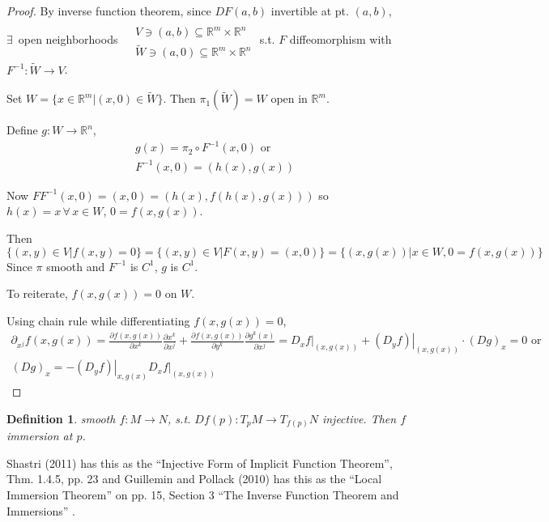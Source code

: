 \documentclass[10pt]{amsart}
\newtheorem{definition}{Definition}
\begin{document}
\begin{multicols*}{2}
\begin{proof}
By inverse function theorem, since $DF(a,b)$ invertible at pt. $(a,b)$, \\
$\exists \, $ open neighborhoods $\begin{aligned} & \quad \\
  & V \ni (a,b) \subseteq \mathbb{R}^m \times \mathbb{R}^n \\
  & \widetilde{W} \ni (a,0) \subseteq \mathbb{R}^m \times \mathbb{R}^n \end{aligned}$ s.t. $F$ diffeomorphism with $F^{-1}: \widetilde{W} \to V$. 

Set $W = \lbrace x \in \mathbb{R}^m | (x,0) \in \widetilde{W}\rbrace$.  Then $\pi_1(\widetilde{W}) =W$ open in $\mathbb{R}^m$.  

Define $g:W\to \mathbb{R}^n$, 
\[
\begin{aligned}
  & g(x) = \pi_2 \circ F^{-1}(x,0) \text{ or } \\ 
  & F^{-1}(x,0) = (h(x),g(x))
\end{aligned}
\]

Now $FF^{-1}(x,0) = (x,0) = (h(x), f(h(x),g(x)) )$ so $h(x)=x \, \forall \, x \in W$, $0 = f(x,g(x))$.  

Then
\[
\lbrace (x,y) \in V | f(x,y) = 0 \rbrace = \lbrace (x,y) \in V | F(x,y) = (x,0) \rbrace = \lbrace (x,g(x)) | x \in W, 0 = f(x,g(x)) \rbrace
\]
Since $\pi$ smooth and $F^{-1}$ is $C^1$, $g$ is $C^1$.  

To reiterate, $f(x,g(x)) =0$ on $W$.

Using chain rule while differentiating $f(x,g(x))=0$, 
\[
\begin{gathered}
\partial_{x^j} f(x,g(x)) = \frac{ \partial f(x,g(x)) }{ \partial x^k} \frac{ \partial x^k}{ \partial x^j}+ \frac{ \partial f(x,g(x))}{ \partial y^k}\frac{ \partial g^k(x)}{\partial x^j} = \left. D_x f \right|_{(x,g(x))} + \left. (D_yf) \right|_{(x,g(x))} \cdot (Dg)_x = 0 \text{ or }  \\
(Dg)_x = -\left. (D_yf) \right|_{x,g(x)} \left. D_xf \right|_{(x,g(x))}
\end{gathered}
\]



\end{proof}

\begin{definition}
  smooth $f:M \to N$, s.t. $Df(p) : T_pM \to T_{f(p)}N$ injective.  Then $f$ immersion at $p$.  
\end{definition}

Shastri (2011) has this as the ``Injective Form of Implicit Function Theorem'', Thm. 1.4.5, pp. 23 and Guillemin and Pollack (2010) has this as the ``Local Immersion Theorem'' on pp. 15, Section 3 ``The Inverse Function Theorem and Immersions'' \cite{VGuilleminAPollack2010}.  


\end{multicols*}
\end{document}
